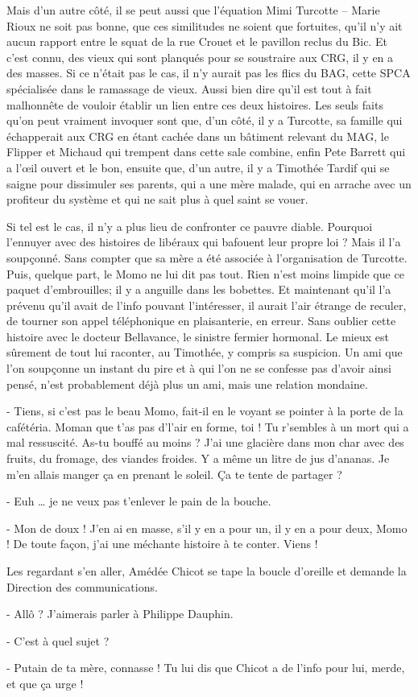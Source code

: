 Mais d’un autre côté, il se peut aussi que l’équation Mimi Turcotte – Marie Rioux ne soit pas bonne, que ces similitudes ne soient que fortuites, qu’il n’y ait aucun rapport entre le squat de la rue Crouet et le pavillon reclus du Bic. Et c’est connu, des vieux qui sont planqués pour se soustraire aux CRG, il y en a des masses. Si ce n’était pas le cas, il n’y aurait pas les flics du BAG, cette SPCA spécialisée dans le ramassage de vieux. Aussi bien dire qu’il est tout à fait malhonnête de vouloir établir un lien entre ces deux histoires. Les seuls faits qu’on peut vraiment invoquer sont que, d’un côté, il y a Turcotte, sa famille qui échapperait aux CRG en étant cachée dans un bâtiment relevant du MAG, le Flipper et Michaud qui trempent dans cette sale combine, enfin Pete Barrett qui a l’œil ouvert et le bon, ensuite que, d’un autre, il y a Timothée Tardif qui se saigne pour dissimuler ses parents, qui a une mère malade, qui en arrache avec un profiteur du système et qui ne sait plus à quel saint se vouer.

Si tel est le cas, il n’y a plus lieu de confronter ce pauvre diable. Pourquoi l’ennuyer avec des histoires de libéraux qui bafouent leur propre loi ? Mais il l’a soupçonné. Sans compter que sa mère a été associée à l’organisation de Turcotte. Puis, quelque part, le Momo ne lui dit pas tout. Rien n’est moins limpide que ce paquet d’embrouilles; il y a anguille dans les bobettes. Et maintenant qu’il l’a prévenu qu’il avait de l’info pouvant l’intéresser, il aurait l’air étrange de reculer, de tourner son appel téléphonique en plaisanterie, en erreur. Sans oublier cette histoire avec le docteur Bellavance, le sinistre fermier hormonal. Le mieux est sûrement de tout lui raconter, au Timothée, y compris sa suspicion. Un ami que l’on soupçonne un instant du pire et à qui l’on ne se confesse pas d’avoir ainsi pensé, n’est probablement déjà plus un ami, mais une relation mondaine.

- Tiens, si c’est pas le beau Momo, fait-il en le voyant se pointer à la porte de la cafétéria. Moman que t’as pas d’l’air en forme, toi ! Tu r’sembles à un mort qui a mal ressuscité. As-tu bouffé au moins ? J’ai une glacière dans mon char avec des fruits, du fromage, des viandes froides. Y a même un litre de jus d’ananas. Je m’en allais manger ça en prenant le soleil. Ça te tente de partager ?

- Euh … je ne veux pas t’enlever le pain de la bouche.

- Mon de doux ! J’en ai en masse, s’il y en a pour un, il y en a pour deux, Momo ! De toute façon, j’ai une méchante histoire à te conter. Viens !

Les regardant s’en aller, Amédée Chicot se tape la boucle d’oreille et demande la Direction des communications.

- Allô ? J’aimerais parler à Philippe Dauphin.

- C’est à quel sujet ?

- Putain de ta mère, connasse ! Tu lui dis que Chicot a de l’info pour lui, merde, et que ça urge !